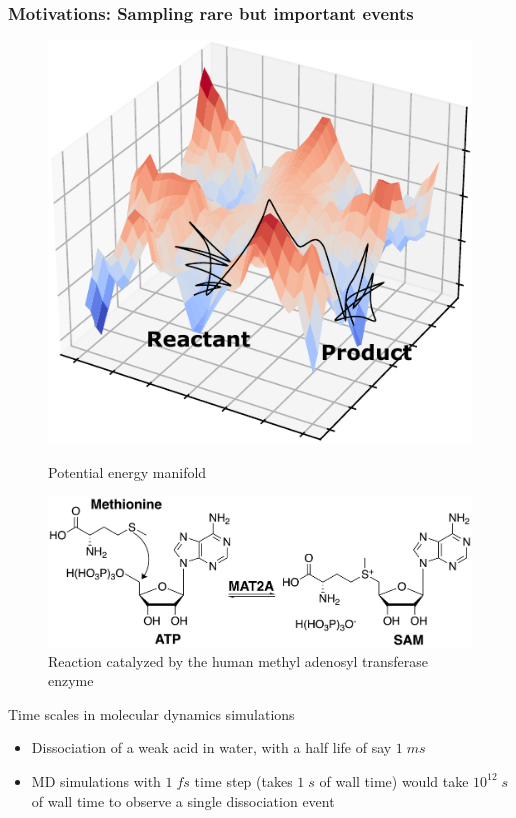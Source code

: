 \documentclass{beamer}
\begin{document}
\begin{frame}
\frametitle{Motivations: Sampling rare but important events}
\pause
\begin{figure}
\centering
\begin{minipage}[b]{0.45\linewidth}
\includegraphics[scale=0.5]{figures/pot-surf.pdf}
\caption{Potential energy manifold}
\end{minipage}
\begin{minipage}[b]{0.45\linewidth}
\includegraphics[scale=0.4]{figures/mat2a-reaction.png}
\caption{Reaction catalyzed by the human methyl adenosyl transferase enzyme}
\end{minipage}
\end{figure}
\pause
\begin{block}{Time scales in molecular dynamics simulations}
{
    \begin{itemize}
        \item Dissociation of a weak acid in water, with a half life of say $1\;ms$ 
        \item MD simulations with $1\;fs$ time step (takes $1\;s$ of wall time)
        would take $10^{12}\;s$ of wall time to observe a single dissociation event 
    \end{itemize}
}
\end{block}
\end{frame}
\end{document}
